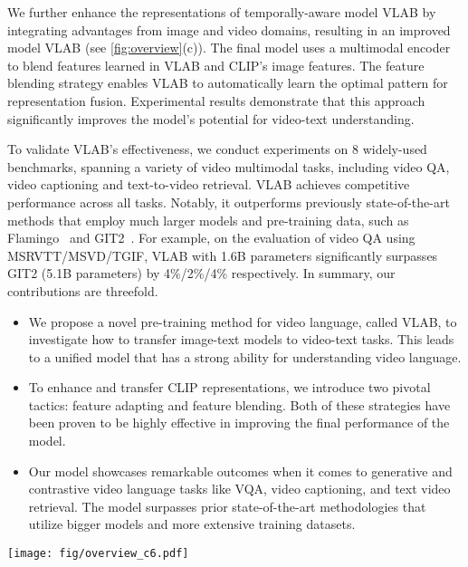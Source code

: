 \documentclass{article}
\begin{document}
We further enhance the representations of temporally-aware model VLAB by integrating advantages from image and video domains, resulting in an improved model VLAB (see \cref{fig:overview}(c)). The final model uses a multimodal encoder to blend features learned in VLAB and CLIP’s image features. The feature blending strategy enables VLAB to automatically learn the optimal pattern for representation fusion. Experimental results demonstrate that this approach significantly improves the model’s potential for video-text understanding.

To validate VLAB's effectiveness, we conduct experiments on 8 widely-used benchmarks, spanning a variety of video multimodal tasks, including video QA, video captioning and text-to-video retrieval. VLAB achieves competitive performance across all tasks. Notably, it outperforms previously state-of-the-art methods that employ much larger models and pre-training data, such as  Flamingo~\cite{alayrac2022flamingo} and GIT2~\cite{wang2022git}. For example, on the evaluation of video QA using 
 MSRVTT/MSVD/TGIF, VLAB with 1.6B parameters significantly surpasses GIT2 (5.1B parameters) by 4\%/2\%/4\% respectively.
In summary, our contributions are threefold.
\begin{itemize}
    \item We propose a novel pre-training method for video language, called VLAB, to investigate how to transfer image-text models to video-text tasks. This leads to a unified model that has a strong ability for understanding video language.
    \item 
    To enhance and transfer CLIP representations, we introduce two pivotal tactics: feature adapting and feature blending. Both of these strategies have been proven to be highly effective in improving the final performance of the model.
    \item 

    Our model showcases remarkable outcomes when it comes to generative and contrastive video language tasks like VQA, video captioning, and text video retrieval. The model surpasses prior state-of-the-art methodologies that utilize bigger models and more extensive training datasets.
\end{itemize}

\begin{figure*}[t]
\begin{center}
\texttt{[image: fig/overview\_c6.pdf]}
\end{center}
\vspace{-0.2cm}
   \caption{VLAB Overview. Powered by the proposed feature adapting and feature blending approaches, VLAB presents \textbf{(c)} a unified video language model for handling both contrastive and generative tasks. ``Enc-V/T/VA'' denote the vision/text/adapted encoders respectively.}
\label{fig:overview}
\vspace{-13pt}
\end{figure*}
\end{document}
